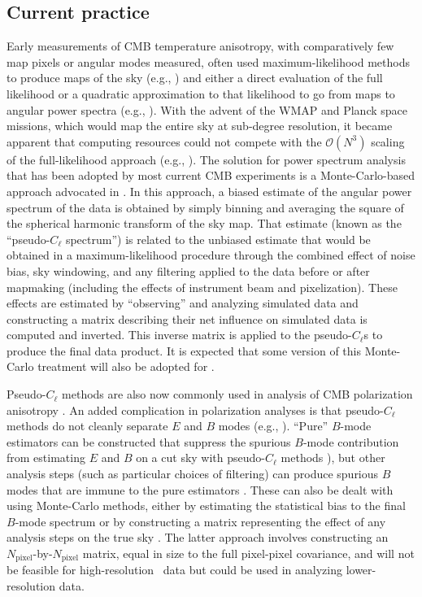 \subsection{Current practice}
\label{se:current}
Early measurements of CMB temperature anisotropy, with comparatively few map pixels or angular modes
measured, often used maximum-likelihood methods to produce maps of the sky (e.g., \cite{wright96}) and
either a direct evaluation of the full likelihood or a quadratic approximation to that likelihood to go from 
maps to angular power spectra (e.g., \cite{bond98a}). With the advent of the WMAP and Planck space 
missions, which would map the entire sky at sub-degree resolution, it became apparent that computing
resources could not compete with the $\mathcal{O}(N^3)$ scaling of the full-likelihood approach 
(e.g., \cite{borrill99}). The solution for power spectrum analysis
that has been adopted by most current CMB experiments is a
Monte-Carlo-based approach advocated in \cite{hivon02}. In this approach, a biased estimate of
the angular power spectrum of the data is obtained by simply binning and averaging the square 
of the spherical harmonic transform of the sky map. That estimate (known as the 
``pseudo-$C_\ell$ spectrum'') is related to the unbiased 
estimate that would be obtained in a maximum-likelihood procedure through the combined effect
of noise bias, sky windowing, and any filtering applied to the data before or after mapmaking
(including the effects of instrument beam and pixelization). These effects are estimated by ``observing''
and analyzing simulated data and constructing a matrix describing their net influence on simulated data is 
computed and inverted. This inverse matrix is applied to the pseudo-$C_\ell$s to produce the 
final data product. It is expected that some version of this Monte-Carlo treatment will also be 
adopted for \cmbexp. 

Pseudo-$C_\ell$ methods are also now commonly used in analysis of CMB polarization anisotropy
\cite{planck15-11,naess14,crites15}. An added complication in polarization analyses is that 
pseudo-$C_\ell$ methods do not cleanly separate $E$ and $B$ modes (e.g., \cite{challinor05}).
``Pure'' $B$-mode estimators can be constructed that suppress the spurious $B$-mode contribution
from estimating $E$ and $B$ on a cut sky with pseudo-$C_\ell$ methods \cite{smith06}), but 
other analysis steps (such as particular choices of filtering) can produce spurious $B$ modes that
are immune to the pure estimators \cite{keisler15}. These can also be dealt with using Monte-Carlo
methods, either by estimating the statistical bias to the final $B$-mode spectrum or by constructing
a matrix representing the effect of any analysis steps on the true sky \cite{BICEP2014}. The latter
approach involves constructing an $N_\mathrm{pixel}$-by-$N_\mathrm{pixel}$ matrix, equal in size to the 
full pixel-pixel covariance, and will not be feasible for high-resolution \cmbexp\ data but could be 
used in analyzing lower-resolution data.

